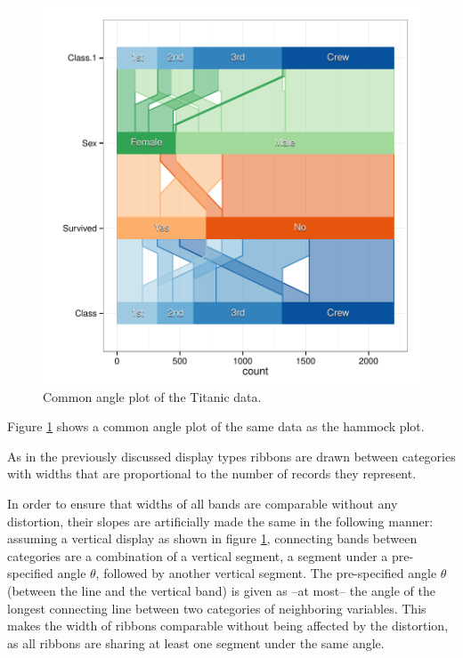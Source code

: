 \documentclass[journal]{vgtc}\usepackage{graphicx, color}
\begin{document}
\begin{figure}[htbp] %
   \centering
   \includegraphics[width=\linewidth]{images/ca-titanic} 
   \caption{ \label{fig:ca-titanic} Common angle plot of the Titanic data. }
  \end{figure}

Figure \ref{fig:ca-titanic} shows a common angle plot of the same data as the hammock plot.

As in the previously discussed display types ribbons are drawn between categories with widths  that are proportional to  the number of records they represent.

In order to ensure that  widths of all bands are  comparable without any distortion, their slopes  are artificially made the same in the following manner: 
assuming a vertical display as shown in figure \ref{fig:ca-titanic},  connecting bands between  categories  are a combination of a vertical  segment, a  segment under a pre-specified angle $\theta$, followed by another vertical  segment.  
The pre-specified angle $\theta$ (between the line and the vertical band) is given as --at most-- the angle of the longest connecting line between two categories of neighboring variables. 
This makes the width of ribbons  comparable without being affected by the distortion, as all ribbons are sharing at least one segment under the same angle. 
\end{document}
